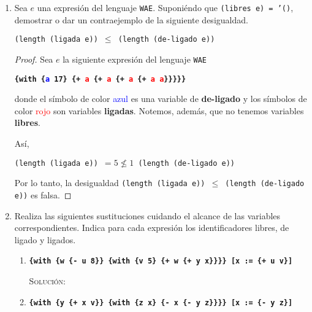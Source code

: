 \documentclass[letterpaper,11pt]{article}
\begin{document}
\begin{enumerate}
    \item Sea $e$ una expresión del lenguaje \texttt{WAE}. Suponiéndo que 
    \texttt{(libres e) = '()}, demostrar o dar un contraejemplo de la siguiente 
    desigualdad.
    \begin{center}
        \texttt{(length (ligada e)) $\leq$ (length (de-ligado e))}
    \end{center}

    \begin{proof}
        Sea $e$ la siguiente expresión del lenguaje \texttt{WAE}
        \begin{center}
            \texttt{\textbf{\{with \{\textcolor{blue}{a} 17\} 
            \{+ \textcolor{red}{a} \{+ \textcolor{red}{a} \{+ \textcolor{red}{a} 
            \{+ \textcolor{red}{a} \textcolor{red}{a}\}\}\}\}\}}}
        \end{center}

        donde el símbolo de color \textcolor{blue}{azul} es una variable de 
        \textbf{de-ligado} y los símbolos de color \textcolor{red}{rojo} son 
        variables \textbf{ligadas}. Notemos, además, que no tenemos variables 
        \textbf{libres}. 

        Así, 
        \begin{center}
            \texttt{(length (ligada e)) $= 5 \not \leq 1$ (length (de-ligado e))}
        \end{center}

        Por lo tanto, la desigualdad \texttt{(length (ligada e)) $\leq$ 
        (length (de-ligado e))} es falsa.
        
    \end{proof}

    \item Realiza las siguientes sustituciones cuidando el alcance de las 
    variables correspondientes. Indica para cada expresión los identificadores 
    libres, de ligado y ligados. 
    \begin{enumerate}
        \item \texttt{\textbf{\{with \{w \{- u 8\}\} \{with \{v 5\} 
        \{+ w \{+ y x\}\}\}\} {[}x := \{+ u v\}{]}}}

        \textsc{Solución:}

        \item \texttt{\textbf{\{with \{y \{+ x v\}\} \{with \{z x\} 
        \{- x \{- y z\}\}\}\} [x := \{- y z\}]}}


\end{enumerate}
\end{enumerate}
\end{document}
